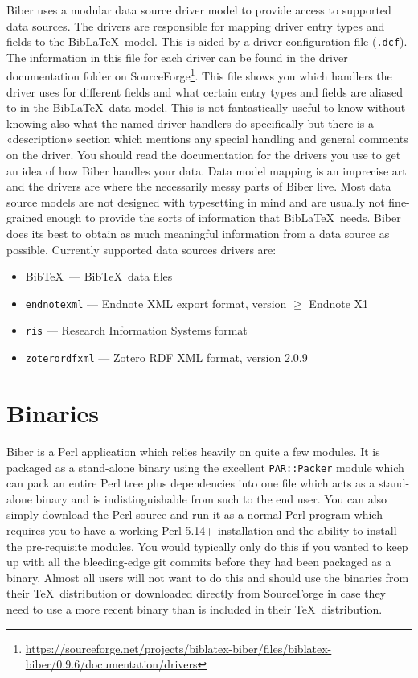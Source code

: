 \documentclass{ltxdockit}
\gdef\biberversion{0.9.6}    %
\begin{document}
Biber uses a modular data source driver model to provide access
to supported data sources. The drivers are responsible for mapping
driver entry types and fields to the Bib\LaTeX\ model. This is
aided by a driver configuration file (\verb+.dcf+). The information in
this file for each driver can be found in the driver documentation folder on
SourceForge\footnote{\url{https://sourceforge.net/projects/biblatex-biber/files/biblatex-biber/\biberversion/documentation/drivers}}. This
file shows you which handlers the driver uses for different fields and
what certain entry types and fields are aliased to in the
Bib\LaTeX\ data model. This is not fantastically useful to know
without knowing also what the named driver handlers do specifically but there
is a «description» section which mentions any special handling and
general comments on the driver. You should read the documentation for
the drivers you use to get an idea of how Biber handles your
data. Data model mapping is an imprecise art
and the drivers are where the necessarily messy parts of Biber
live. Most data source models are not designed with typesetting in
mind and are usually not fine-grained enough to provide the sorts of
information that Bib\LaTeX\ needs. Biber does its best to
obtain as much meaningful information from a data source as possible.
Currently supported data sources drivers are:

\begin{itemize}
\item Bib\TeX\ --- Bib\TeX\ data files
\item \verb+endnotexml+ --- Endnote XML export format, version $\geq$ Endnote X1
\item \verb+ris+ --- Research Information Systems format
\item \verb+zoterordfxml+ --- Zotero RDF XML format, version 2.0.9
\end{itemize}

\section{Binaries}\label{binaries}

Biber is a Perl application which relies heavily on quite a few
modules. It is packaged as a stand-alone binary using the excellent
\verb+PAR::Packer+ module which can pack an entire Perl tree plus
dependencies into one file which acts as a stand-alone binary and is
indistinguishable from such to the end user. You can also simply download
the Perl source and run it as a normal Perl program which
requires you to have a working Perl 5.14+ installation and the
ability to install the pre-requisite modules. You would typically only do
this if you wanted to keep up with all the bleeding-edge git commits before
they had been packaged as a binary. Almost all users will not want to do
this and should use the binaries from their \TeX\ distribution or downloaded
directly from SourceForge in case they need to use a more recent binary
than is included in their \TeX\ distribution.
\end{document}
